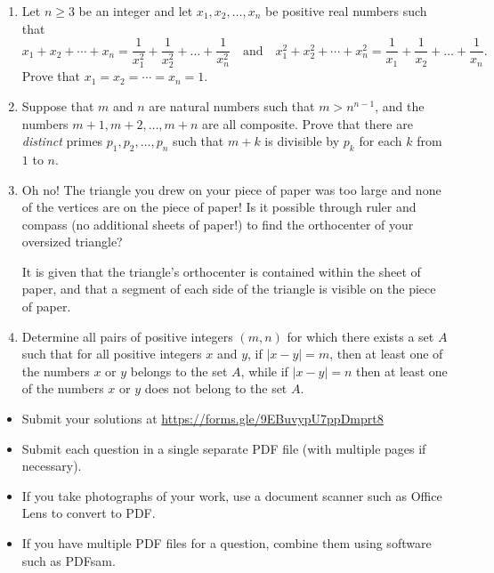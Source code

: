 \documentclass{article}
\begin{document}
\begin{enumerate}[itemsep=\fill]
\item %
Let $n \geq 3$ be an integer and let $x_1, x_2, \dotsc, x_n$ be positive real numbers such that
\[ x_1 + x_2 + \dotsb + x_n = \frac{1}{x_1^2} + \frac{1}{x_2^2} +\dotsc + \frac{1}{x_n^2} \quad \text{and} \quad x_1^2 + x_2^2 + \dotsb + x_n^2 = \frac{1}{x_1} + \frac{1}{x_2} +\dotsc + \frac{1}{x_n}. \]
Prove that $x_1 = x_2 = \dotsb = x_n =1$.


\item %
Suppose that $m$ and $n$ are natural numbers such that $m > n^{n - 1}$, and the numbers $m + 1, m + 2, \dots, m + n$ are all composite. Prove that there are \emph{distinct} primes $p_1, p_2, \dots, p_n$ such that $m + k$ is divisible by $p_k$ for each $k$ from $1$ to $n$.


\item %
Oh no! The triangle you drew on your piece of paper was too large and none of the vertices are on the piece of paper! Is it possible through ruler and compass (no additional sheets of paper!) to find the orthocenter of your oversized triangle?

It is given that the triangle's orthocenter is contained within the sheet of paper, and that a segment of each side of the triangle is visible on the piece of paper. 

\item %
Determine all pairs of positive integers $(m, n)$ for which there exists a set $A$ such that for all positive integers $x$ and $y$, if $|x - y| = m$, then at least one of the numbers $x$ or $y$ belongs to the set $A$, while if $|x - y| = n$ then at least one of the numbers $x$ or $y$ does not belong to the set $A$.


\end{enumerate}


\vfill
\small
\begin{itemize}
	\item Submit your solutions at \href{https://forms.gle/9EBuvypU7ppDmprt8}{https://forms.gle/9EBuvypU7ppDmprt8}
	\item Submit each question in a single separate PDF file (with multiple pages if necessary).
	\item If you take photographs of your work, use a document scanner such as Office Lens to convert to PDF.
	\item If you have multiple PDF files for a question, combine them using software such as PDFsam.
\end{itemize}


\end{document}
